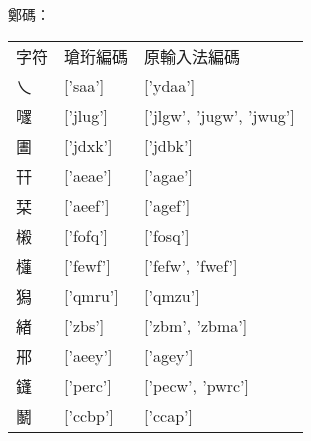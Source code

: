 鄭碼：\\
\begin{tabular}[t]{lll}
字符 & 瑲珩編碼 & 原輸入法編碼\\
乀 & ['saa'] & ['ydaa']\\
嚺 & ['jlug'] & ['jlgw', 'jugw', 'jwug']\\
圕 & ['jdxk'] & ['jdbk']\\
幵 & ['aeae'] & ['agae']\\
栞 & ['aeef'] & ['agef']\\
樧 & ['fofq'] & ['fosq']\\
櫣 & ['fewf'] & ['fefw', 'fwef']\\
獡 & ['qmru'] & ['qmzu']\\
緖 & ['zbs'] & ['zbm', 'zbma']\\
郉 & ['aeey'] & ['agey']\\
鑝 & ['perc'] & ['pecw', 'pwrc']\\
鬭 & ['ccbp'] & ['ccap']\\
\end{tabular}


